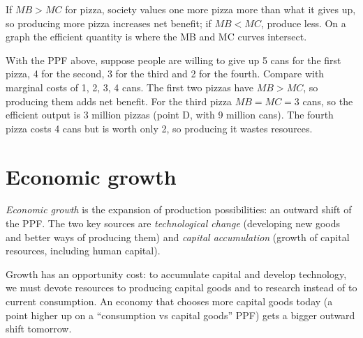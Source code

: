 If $MB > MC$ for pizza, society values one more pizza more than what it gives up, so
producing more pizza increases net benefit; if $MB < MC$, produce less. On a graph the
efficient quantity is where the MB and MC curves intersect.

\begin{center}
\end{center}

\begin{example}
With the PPF above, suppose people are willing to give up 5 cans for the first pizza, 4
for the second, 3 for the third and 2 for the fourth. Compare with marginal costs of
1, 2, 3, 4 cans. The first two pizzas have $MB > MC$, so producing them adds net
benefit. For the third pizza $MB = MC = 3$ cans, so the efficient output is 3 million
pizzas (point D, with 9 million cans). The fourth pizza costs 4 cans but is worth only 2,
so producing it wastes resources.
\end{example}

\section{Economic growth}

\begin{definition}
\emph{Economic growth} is the expansion of production possibilities: an outward shift of
the PPF. The two key sources are \emph{technological change} (developing new goods and
better ways of producing them) and \emph{capital accumulation} (growth of capital
resources, including human capital).
\end{definition}

Growth has an opportunity cost: to accumulate capital and develop technology, we must
devote resources to producing capital goods and to research instead of to current
consumption. An economy that chooses more capital goods today (a point higher up on a
``consumption vs capital goods'' PPF) gets a bigger outward shift tomorrow.

